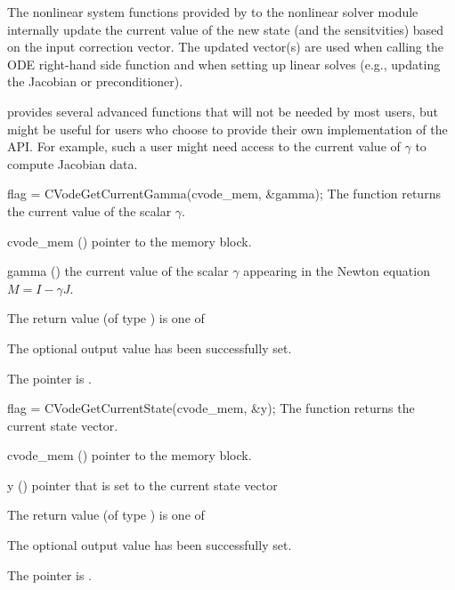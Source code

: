 The nonlinear system functions provided by {\cvodes} to the nonlinear solver
module internally update the current value of the new state (and the
sensitvities) based on the input correction vector. The updated vector(s) are
used when calling the ODE right-hand side function and when setting up linear
solves (e.g., updating the Jacobian or preconditioner).

{\cvodes} provides several advanced functions that will not be needed by most
users, but might be useful for users who choose to provide their own
implementation of the  API. For example, such a user
might need access to the current value of $\gamma$ to compute Jacobian data.

{
  flag = CVodeGetCurrentGamma(cvode\_mem, \&gamma);
}
{
  The function  returns the current
  value of the scalar $\gamma$.
}
{
  \begin{args}
  \item[cvode\_mem] ()
    pointer to the {\cvode} memory block.
  \item[gamma] ()
      the current value of the scalar $\gamma$ appearing in the
      Newton equation $M = I - \gamma J$.
  \end{args}
}
{
  The return value  (of type ) is one of
  \begin{args}
  \item[\Id{CV\_SUCCESS}]
    The optional output value has been successfully set.
  \item[\Id{CV\_MEM\_NULL}]
    The  pointer is .
  \end{args}
}
{}
{
  flag = CVodeGetCurrentState(cvode\_mem, \&y);
}
{
  The function  returns the current state vector.
}
{
  \begin{args}
  \item[cvode\_mem] ()
    pointer to the {\cvode} memory block.
  \item[y] ()
    pointer that is set to the current state vector
  \end{args}
}
{
  The return value  (of type ) is one of
  \begin{args}
  \item[\Id{CV\_SUCCESS}]
    The optional output value has been successfully set.
  \item[\Id{CV\_MEM\_NULL}]
    The  pointer is .
  \end{args}
}
